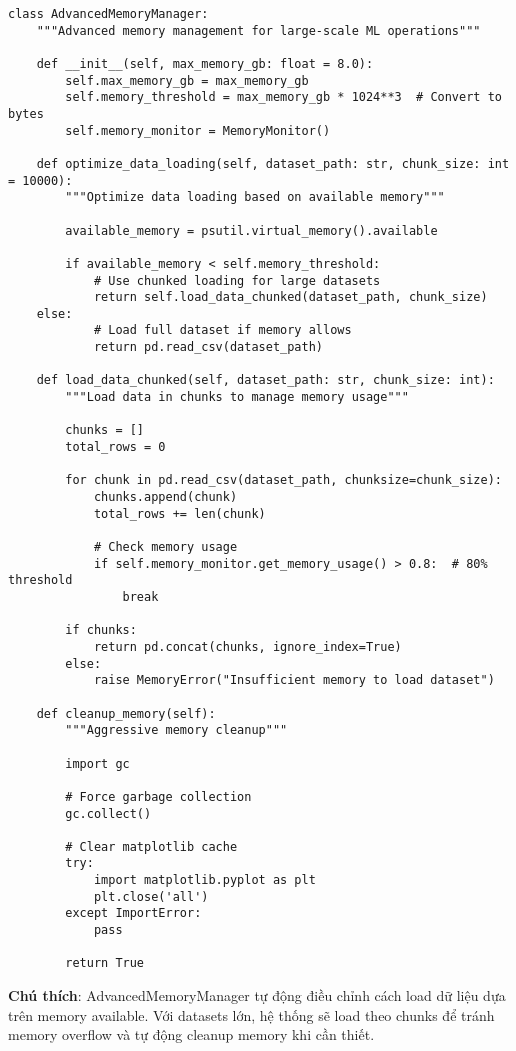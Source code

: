 \begin{verbatim}
class AdvancedMemoryManager:
    """Advanced memory management for large-scale ML operations"""
    
    def __init__(self, max_memory_gb: float = 8.0):
        self.max_memory_gb = max_memory_gb
        self.memory_threshold = max_memory_gb * 1024**3  # Convert to bytes
        self.memory_monitor = MemoryMonitor()
        
    def optimize_data_loading(self, dataset_path: str, chunk_size: int = 10000):
        """Optimize data loading based on available memory"""
        
        available_memory = psutil.virtual_memory().available
        
        if available_memory < self.memory_threshold:
            # Use chunked loading for large datasets
            return self.load_data_chunked(dataset_path, chunk_size)
    else:
            # Load full dataset if memory allows
            return pd.read_csv(dataset_path)
            
    def load_data_chunked(self, dataset_path: str, chunk_size: int):
        """Load data in chunks to manage memory usage"""
        
        chunks = []
        total_rows = 0
        
        for chunk in pd.read_csv(dataset_path, chunksize=chunk_size):
            chunks.append(chunk)
            total_rows += len(chunk)
            
            # Check memory usage
            if self.memory_monitor.get_memory_usage() > 0.8:  # 80% threshold
                break
                
        if chunks:
            return pd.concat(chunks, ignore_index=True)
        else:
            raise MemoryError("Insufficient memory to load dataset")
            
    def cleanup_memory(self):
        """Aggressive memory cleanup"""
        
        import gc
        
        # Force garbage collection
        gc.collect()
        
        # Clear matplotlib cache
        try:
            import matplotlib.pyplot as plt
            plt.close('all')
        except ImportError:
            pass
            
        return True
\end{verbatim}

\textbf{Chú thích}: AdvancedMemoryManager tự động điều chỉnh cách load dữ liệu dựa trên memory available. Với datasets lớn, hệ thống sẽ load theo chunks để tránh memory overflow và tự động cleanup memory khi cần thiết.

